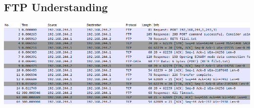 \documentclass[12pt]{extarticle}
\begin{document}
\subsection{FTP Understanding}
\begin{center}
\includegraphics[scale=0.6]{resources/6-1-1.png}
\end{center}
\end{document}
